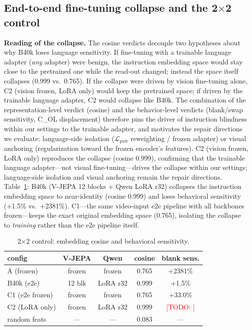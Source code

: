 \documentclass[10pt,twocolumn]{article}
\newcommand{\Lpair}{\mathcal{L}_{\mathrm{pair}}}
\newcommand{\todo}[1]{\textcolor{red}{[TODO: #1]}}
\begin{document}
\subsection{End-to-end fine-tuning collapse and the 2$\times$2 control}
\label{sec:collapse}

\textbf{Reading of the collapse.} The cosine verdicts decouple two hypotheses
about why B40k loses language sensitivity. If fine-tuning with a trainable
language adapter (\emph{any} adapter) were benign, the instruction embedding
space would stay close to the pretrained one while the read-out changed;
instead the space itself collapses (0.999 vs.\ 0.765). If the collapse were
driven by vision fine-tuning alone, C2 (vision frozen, LoRA only) would keep
the pretrained space; if driven by the trainable language adapter, C2 would
collapse like B40k. The combination of the representation-level verdict
(cosine) and the behavior-level verdicts (blank/swap sensitivity, C\_OL
displacement) therefore pins the driver of instruction blindness within our
settings to the trainable adapter, and motivates the repair directions we
evaluate: language-side isolation ($\Lpair$ reweighting / frozen adapter) or
visual anchoring (regularization toward the frozen encoder's features).
C2 (vision frozen, LoRA only) reproduces the collapse (cosine 0.999), confirming that the trainable language adapter---not visual fine-tuning---drives the collapse within our settings; language-side isolation and visual anchoring remain the repair directions.
Table~\ref{tab:2x2}: B40k (V-JEPA 12 blocks + Qwen LoRA r32) collapses the
instruction embedding space to near-identity (cosine 0.999) and loses
behavioral sensitivity (+1.5\% vs.\ +2381\%). C1---the same video-input e2e
pipeline with all backbones frozen---keeps the exact original embedding space
(0.765), isolating the collapse to \emph{training} rather than the e2e
pipeline itself.

\begin{table}[t]
\centering\small
\caption{2$\times$2 control: embedding cosine and behavioral sensitivity.}
\label{tab:2x2}
\begin{tabular}{lcccc}
\toprule
config & V-JEPA & Qwen & cosine & blank sens.\\
\midrule
A (frozen) & frozen & frozen & 0.765 & +2381\%\\
B40k (e2e) & 12 blk & LoRA r32 & 0.999 & +1.5\%\\
C1 (e2e frozen) & frozen & frozen & 0.765 & +33.0\%\\
C2 (LoRA only) & frozen & LoRA r32 & 0.999 & \todo{}\\
random feats & --- & --- & 0.083 & ---\\
\bottomrule
\end{tabular}
\end{table}
\end{document}
